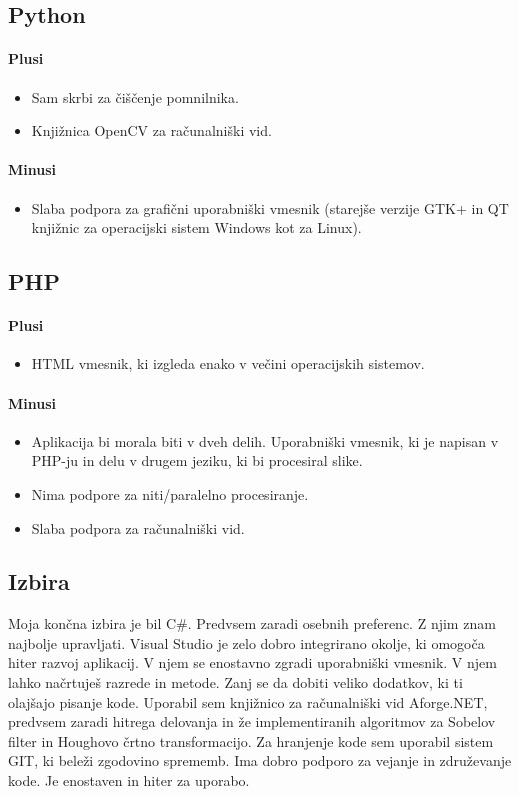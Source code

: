 \documentclass[oneside, a4paper, 12pt]{book}
\begin{document}
\subsection{Python}
\paragraph{Plusi}
\begin{itemize}
\item Sam skrbi za čiščenje pomnilnika.
\item Knjižnica OpenCV za računalniški vid.
\end{itemize}
\paragraph{Minusi}
\begin{itemize}
\item Slaba podpora za grafični uporabniški vmesnik (starejše verzije 
GTK+ in QT knjižnic za operacijski sistem Windows kot za Linux).
\end{itemize}

\subsection{PHP}
\paragraph{Plusi}
\begin{itemize}
\item HTML vmesnik, ki izgleda enako v večini operacijskih sistemov.
\end{itemize}
\paragraph{Minusi}
\begin{itemize}
\item Aplikacija bi morala biti v dveh delih. Uporabniški vmesnik, ki 
je napisan v PHP-ju in delu v drugem jeziku, ki bi procesiral slike.
\item Nima podpore za niti/paralelno procesiranje.
\item Slaba podpora za računalniški vid.
\end{itemize}

\subsection{Izbira}
Moja končna izbira je bil C\#. Predvsem zaradi osebnih preferenc. Z 
njim znam najbolje upravljati. Visual Studio je zelo dobro integrirano 
okolje, ki omogoča hiter razvoj aplikacij. V njem se enostavno zgradi 
uporabniški vmesnik. V njem lahko načrtuješ razrede in metode. Zanj se 
da dobiti veliko dodatkov, ki ti olajšajo pisanje kode. Uporabil sem 
knjižnico za računalniški vid Aforge.NET, predvsem zaradi hitrega 
delovanja in že implementiranih algoritmov za Sobelov filter in Houghovo
črtno transformacijo. Za hranjenje kode sem uporabil sistem GIT, ki 
beleži zgodovino sprememb. Ima dobro podporo za vejanje in združevanje 
kode. Je enostaven in hiter za uporabo.
\end{document}
